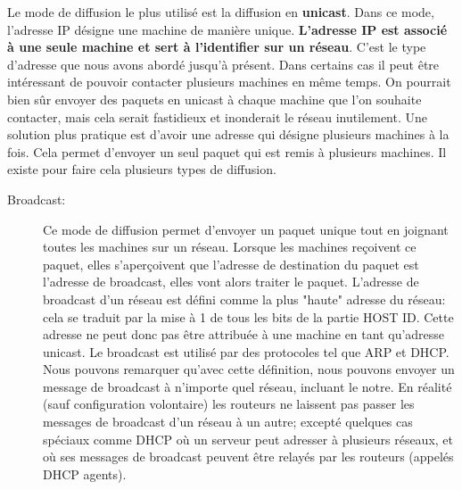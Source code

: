 \smallbreak
Le mode de diffusion le plus utilisé est la diffusion en \textbf{unicast}. Dans ce mode,
l'adresse IP désigne une machine de manière unique. \textbf{L'adresse IP est
associé à une seule machine et sert à l'identifier sur un réseau}.  C'est le
type d'adresse que nous avons abordé jusqu'à présent. 
Dans certains cas il peut être
intéressant de pouvoir contacter plusieurs machines en même temps. On pourrait bien sûr
envoyer des paquets en unicast à chaque machine que l'on souhaite contacter,
mais cela serait fastidieux et inonderait le réseau inutilement. Une solution plus
pratique est d'avoir une adresse qui désigne plusieurs machines à la fois. Cela
permet d'envoyer un seul paquet qui est remis à plusieurs machines. Il
existe pour faire cela plusieurs types de diffusion.

\begin{description}
\item[Broadcast:] Ce mode de diffusion permet d'envoyer un paquet unique tout en 
joignant toutes les machines sur un réseau. Lorsque les machines reçoivent ce
paquet, elles s'aperçoivent que l'adresse de destination du paquet est l'adresse de
broadcast, elles vont alors traiter le paquet. L'adresse de broadcast d'un réseau
est défini comme la plus "haute" adresse du réseau: cela se traduit par la mise
à 1 de tous les bits de la partie HOST ID. Cette adresse ne peut donc pas être
attribuée à une machine en tant qu'adresse unicast.  Le broadcast est utilisé
par des protocoles tel que ARP et DHCP.  Nous pouvons remarquer qu'avec cette
définition, nous pouvons envoyer un message de broadcast à n'importe quel
réseau, incluant le notre. En réalité (sauf
configuration volontaire) les routeurs ne laissent pas passer les messages de
broadcast d'un réseau à un autre; excepté quelques cas spéciaux comme DHCP où un
serveur peut adresser à plusieurs réseaux, et où ses messages de broadcast
peuvent être relayés par les routeurs (appelés DHCP agents).


\end{description}
